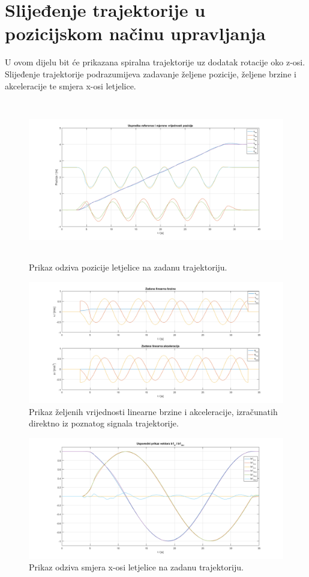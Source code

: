 \documentclass[times, utf8, diplomski, numeric]{fer}
\begin{document}
	\section{Slijeđenje trajektorije u pozicijskom načinu upravljanja}
	U ovom dijelu bit će prikazana spiralna trajektorije uz dodatak rotacije oko z-osi. Slijeđenje trajektorije podrazumijeva zadavanje željene pozicije, željene brzine i akceleracije te smjera x-osi letjelice.
	
	\begin{figure}[h!]
		\includegraphics[width=\textwidth, height=7cm]{plots/traj_pos2.png}
		\caption{Prikaz odziva pozicije letjelice na zadanu trajektoriju.}
	\end{figure}
	
	\newpage
	\clearpage
	
	\begin{figure}[h!]
		\includegraphics[width=\textwidth]{plots/traj_a_v2.png}
		\caption{Prikaz željenih vrijednosti linearne brzine i akceleracije, izračunatih direktno iz poznatog signala trajektorije.}
	\end{figure}
	
	\begin{figure}[h!]
		\includegraphics[width=\textwidth]{plots/traj_b1d2.png}
		\caption{Prikaz odziva smjera x-osi letjelice na zadanu trajektoriju. }
	\end{figure}
	
\end{document}
